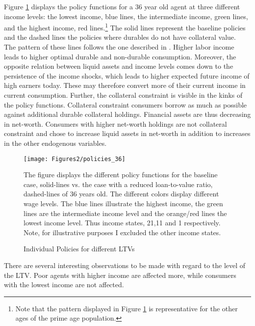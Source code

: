 \documentclass[a4paper,12pt,legno]{article}
\begin{document}
Figure \ref{policy_downpayment0_age36} displays the policy functions for a 36 year old agent at three different income levels: the lowest income, blue lines, the intermediate income, green lines, and the highest income, red lines.\footnote{Note that the pattern displayed in Figure \ref{policy_downpayment0_age36} is representative for the other ages of the prime age population.} The solid lines represent the baseline policies and the dashed lines the policies where durables do not have collateral value.\\ 
The pattern of these lines follows the one described in \cite{hintermaier2010}. Higher labor income leads to higher optimal durable and non-durable consumption. Moreover, the opposite relation between liquid assets and income levels comes down to the persistence of the income shocks, which leads to higher expected future income of high earners today. These may therefore convert more of their current income in current consumption. Further, the collateral constraint is visible in the kinks of the policy functions. Collateral constraint consumers borrow as much as possible against additional durable collateral holdings. Financial assets are thus decreasing in net-worth. Consumers with higher net-worth holdings are not collateral constraint and chose to increase liquid assets in net-worth in addition to increases in the other endogenous variables.
\begin{figure}[!htbp]
\caption{Individual Policies for different LTVs} 
\label{policy_downpayment0_age36}	%
\centering
\texttt{[image: Figures2/policies\_36]}  %

\begin{minipage}{0.8\linewidth}
\footnotesize{The figure displays the different policy functions for the baseline case, solid-lines vs. the case with a reduced loan-to-value ratio, dashed-lines of 36 years old. The different colors display different wage levels. The blue lines illustrate the highest income, the green lines are the intermediate income level and the orange/red lines the lowest income level. Thus income states, 21,11 and 1 respectively. Note, for illustrative purposes I excluded the other income states.}
\end{minipage}

\end{figure}
There are several interesting observations to be made with regard to the level of the LTV. Poor agents with higher income are affected more, while consumers with the lowest income are not affected.
\end{document}
